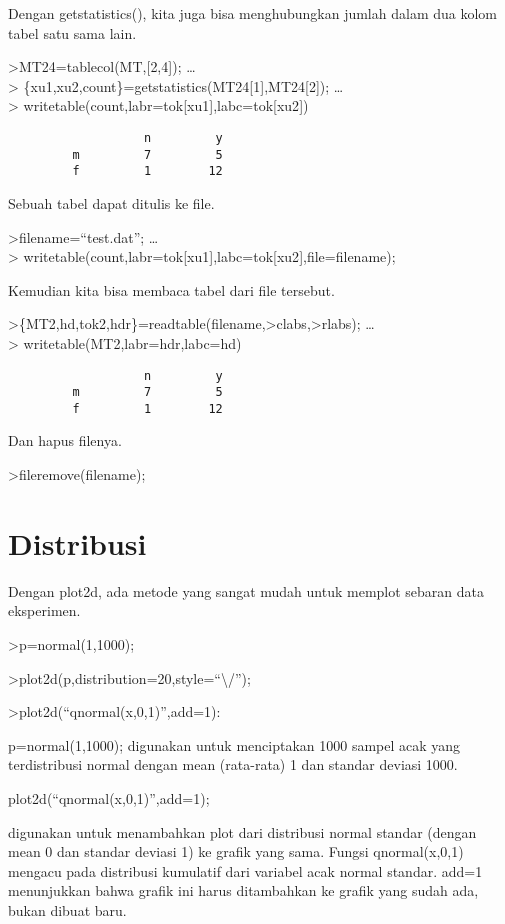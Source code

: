 \documentclass[
]{book}
\begin{document}
Dengan getstatistics(), kita juga bisa menghubungkan jumlah dalam dua kolom tabel satu sama lain.

\textgreater MT24=tablecol(MT,{[}2,4{]}); \ldots{}\\
\textgreater{} \{xu1,xu2,count\}=getstatistics(MT24{[}1{]},MT24{[}2{]}); \ldots{}\\
\textgreater{} writetable(count,labr=tok{[}xu1{]},labc=tok{[}xu2{]})

\begin{verbatim}
                   n         y
         m         7         5
         f         1        12
\end{verbatim}

Sebuah tabel dapat ditulis ke file.

\textgreater filename=``test.dat''; \ldots{}\\
\textgreater{} writetable(count,labr=tok{[}xu1{]},labc=tok{[}xu2{]},file=filename);

Kemudian kita bisa membaca tabel dari file tersebut.

\textgreater\{MT2,hd,tok2,hdr\}=readtable(filename,\textgreater clabs,\textgreater rlabs); \ldots{}\\
\textgreater{} writetable(MT2,labr=hdr,labc=hd)

\begin{verbatim}
                   n         y
         m         7         5
         f         1        12
\end{verbatim}

Dan hapus filenya.

\textgreater fileremove(filename);

\chapter{Distribusi}\label{distribusi}

Dengan plot2d, ada metode yang sangat mudah untuk memplot sebaran data eksperimen.

\textgreater p=normal(1,1000);

\textgreater plot2d(p,distribution=20,style=``\textbackslash/'');

\textgreater plot2d(``qnormal(x,0,1)'',add=1):

p=normal(1,1000); digunakan untuk menciptakan 1000 sampel acak yang terdistribusi normal dengan mean (rata-rata) 1 dan standar deviasi 1000.

plot2d(``qnormal(x,0,1)'',add=1);

digunakan untuk menambahkan plot dari distribusi normal standar (dengan mean 0 dan standar deviasi 1) ke grafik yang sama. Fungsi qnormal(x,0,1) mengacu pada distribusi kumulatif dari variabel acak normal standar. add=1 menunjukkan bahwa grafik ini harus ditambahkan ke grafik yang sudah ada, bukan dibuat baru.
\end{document}
